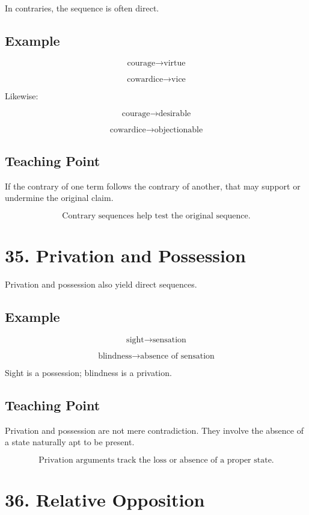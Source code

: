\documentclass[12pt]{article}
\begin{document}
In contraries, the sequence is often direct.

\subsection*{Example}

\[
\text{courage} \rightarrow \text{virtue}
\]

\[
\text{cowardice} \rightarrow \text{vice}
\]

Likewise:

\[
\text{courage} \rightarrow \text{desirable}
\]

\[
\text{cowardice} \rightarrow \text{objectionable}
\]

\subsection*{Teaching Point}

If the contrary of one term follows the contrary of another, that may support
or undermine the original claim.

\[
\boxed{
\text{Contrary sequences help test the original sequence.}
}
\]

\section*{35. Privation and Possession}

Privation and possession also yield direct sequences.

\subsection*{Example}

\[
\text{sight} \rightarrow \text{sensation}
\]

\[
\text{blindness} \rightarrow \text{absence of sensation}
\]

Sight is a possession; blindness is a privation.

\subsection*{Teaching Point}

Privation and possession are not mere contradiction. They involve the absence
of a state naturally apt to be present.

\[
\boxed{
\text{Privation arguments track the loss or absence of a proper state.}
}
\]

\section*{36. Relative Opposition}
\end{document}
